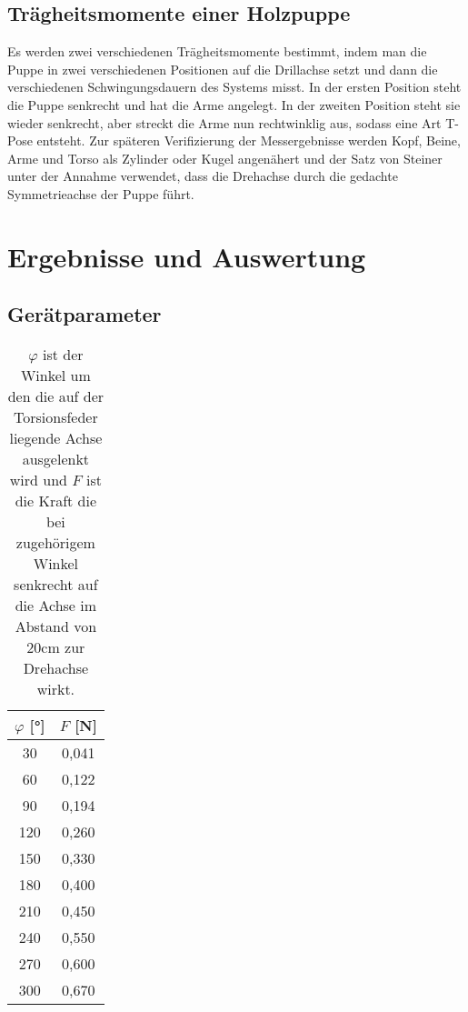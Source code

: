 \documentclass[titlepage = firstcover]{scrartcl}
\begin{document}
      \subsection{Trägheitsmomente einer Holzpuppe}
      Es werden zwei verschiedenen Trägheitsmomente bestimmt, indem man die Puppe in zwei verschiedenen Positionen auf die Drillachse setzt und dann die verschiedenen
      Schwingungsdauern des Systems misst. In der ersten Position steht die Puppe senkrecht und hat die Arme angelegt. In der zweiten Position steht sie wieder 
      senkrecht, aber streckt die Arme nun rechtwinklig aus, sodass eine Art T-Pose entsteht. Zur späteren Verifizierung der Messergebnisse werden Kopf, Beine, Arme
      und Torso als Zylinder oder Kugel angenähert und der Satz von Steiner unter der Annahme verwendet, dass die Drehachse durch die gedachte Symmetrieachse der
      Puppe führt.

    \section{Ergebnisse und Auswertung}

      \subsection{Gerätparameter}
      \begin{table}[h]
        \centering
        \caption{$\varphi$ ist der Winkel um den die auf der Torsionsfeder liegende Achse ausgelenkt wird und $F$ ist die Kraft die bei zugehörigem Winkel senkrecht auf die Achse im Abstand von 20cm zur Drehachse wirkt.}
        \label{tab:Tabelle_1}

        \begin{tabular}{c c}
          \toprule
          {$\varphi$ [°]} & {$F$ [N]} \\
          \midrule
          30 & 0,041 \\
          60 & 0,122 \\
          90 & 0,194 \\
          120 & 0,260 \\
          150 & 0,330 \\
          180 & 0,400 \\
          210 & 0,450 \\
          240 & 0,550 \\
          270 & 0,600 \\
          300 & 0,670 \\
          \bottomrule
        \end{tabular}
      \end{table}
      
\end{document}
